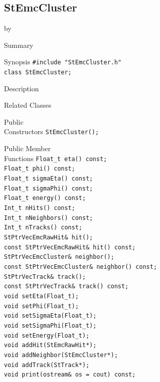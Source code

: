 \documentclass[twoside]{article}
\newcommand{\entrylabel}[1]{\mbox{\textbf{{#1}}}\hfil}%
\newenvironment{entry}
{\begin{list}{}%
    {\renewcommand{\makelabel}{\entrylabel}%
     \setlength{\labelwidth}{90pt}%
     \setlength{\leftmargin}{\labelwidth}
     \advance\leftmargin by \labelsep%
      }%
    }%
  {\end{list}}
\newcommand{\Entrylabel}[1]%
{\raisebox{0pt}[1ex][0pt]{\makebox[\labelwidth][l]%
    {\parbox[t]{\labelwidth}{\hspace{0pt}\textbf{{#1}}}}}}
\newenvironment{Entry}%
{\renewcommand{\entrylabel}{\Entrylabel}\begin{entry}}%
  {\end{entry}}
\begin{document}
\subsection{StEmcCluster}
\label{sec:StEmcCluster}
\begin{Entry}
\item[Summary]
\item[Synopsis]
    \verb+#include "StEmcCluster.h"+\\
    \verb+class StEmcCluster;+\\
\item[Description]
\item[Related Classes]
\item[Public\\ Constructors]
    \verb+StEmcCluster();+\\
\item[Public Member\\ Functions]
    \verb+Float_t eta() const;+\\
    \verb+Float_t phi() const;+\\
    \verb+Float_t sigmaEta() const;+\\
    \verb+Float_t sigmaPhi() const;+\\
    \verb+Float_t energy() const;+\\
    \verb+Int_t nHits() const; +\\
    \verb+Int_t nNeighbors() const;+\\
    \verb+Int_t nTracks() const;+\\
    \verb+StPtrVecEmcRawHit& hit();+\\
    \verb+const StPtrVecEmcRawHit& hit() const;+\\
    \verb+StPtrVecEmcCluster& neighbor();+\\
    \verb+const StPtrVecEmcCluster& neighbor() const;+\\
    \verb+StPtrVecTrack& track();+\\
    \verb+const StPtrVecTrack& track() const;+\\
    \verb+void setEta(Float_t);+\\
    \verb+void setPhi(Float_t);+\\
    \verb+void setSigmaEta(Float_t);+\\
    \verb+void setSigmaPhi(Float_t);+\\
    \verb+void setEnergy(Float_t);+\\
    \verb+void addHit(StEmcRawHit*);+\\
    \verb+void addNeighbor(StEmcCluster*);+\\
    \verb+void addTrack(StTrack*);+\\
    \verb+void print(ostream& os = cout) const;+\\
\end{Entry}
\clearpage
\end{document}
